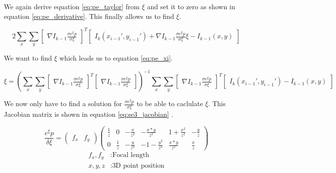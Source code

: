 \documentclass[11pt,a4paper,titlepage,oneside]{report}
\begin{document}
We again derive equation \ref{eq:pe_taylor} from $\xi$ and set it to zero as shown in equation \ref{eq:pe_derivative}. This finally allows us to find $\xi$.

\begin{equation}\label{eq:pe_derivative}
  2\sum_x\sum_y\begin{bmatrix}\nabla I_{k-1}\frac{\sigma e^{\xi}p}{\sigma \xi}\end{bmatrix}^T\begin{bmatrix}I_{k}(x_{i-1}',y_{i-1}')+\nabla I_{k-1}\frac{\sigma e^{\xi} p}{\sigma \xi}\xi-I_{k-1}(x,y)\end{bmatrix}
\end{equation}

We want to find $\xi$ which leads us to equation \ref{eq:pe_xi}.

\tiny
\begin{equation}\label{eq:pe_xi}
  \xi=(\sum_x\sum_y\begin{bmatrix}\nabla I_{k-1}\frac{\sigma e^{\xi}p}{\sigma \xi}\end{bmatrix}^T\begin{bmatrix}\nabla I_{k-1}\frac{\sigma e^{\xi}p}{\sigma \xi}\end{bmatrix})^{-1}
  \sum_x\sum_y\begin{bmatrix}\nabla I_{k-1}\frac{\sigma e^{\xi}p}{\sigma \xi}\end{bmatrix}^T\begin{bmatrix}I_{k}(x_{i-1}',y_{i-1}') - I_{k-1}(x,y)\end{bmatrix}
\end{equation}
\normalsize

We now only have to find a solution for $\frac{\sigma e^{\xi}p}{\sigma \xi}$ to be able to caclulate $\xi$. This Jacobian matrix is shown in equation \ref{eq:se3_jacobian} \cite{se3_explain}.

\begin{equation}\label{eq:se3_jacobian}
  \frac{e^{\xi}p}{\delta \xi}=
  \begin{pmatrix}
    f_x & f_y
  \end{pmatrix}
  \begin{pmatrix}
    \frac{1}{z} & 0 & -\frac{x}{z^2} & -\frac{x*y}{z^2} & 1 + \frac{x^2}{z^2} & -\frac{y}{z} \\
    0 & \frac{1}{z}  & -\frac{y}{z^2} & -1 - \frac{y^2}{z^2} & \frac{x*y}{z^2} &  \frac{x}{z}
  \end{pmatrix}
\end{equation}
\begin{align*}
  f_x,f_y  &:  \text{Focal length}\\
  x,y,z    &:  \text{3D point position}\\
\end{align*}
\end{document}
